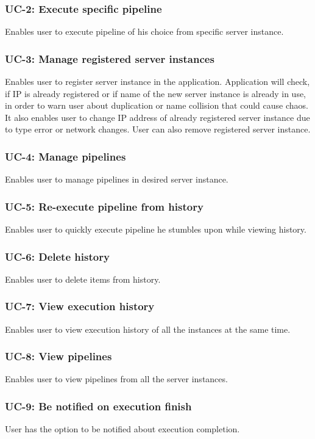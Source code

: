 \subsubsection*{UC-2: Execute specific pipeline}
Enables user to execute pipeline of his choice from specific server instance.
\subsubsection*{UC-3: Manage registered server instances}
Enables user to register server instance in the application. Application will check, if IP is already registered or if name of the new server instance is already in use, in order to warn user about duplication or name collision that could cause chaos. It also enables user to change IP address of already registered server instance due to type error or network changes. User can also remove registered server instance.
\subsubsection*{UC-4: Manage pipelines}
Enables user to manage pipelines in desired server instance.
\subsubsection*{UC-5: Re-execute pipeline from history}
Enables user to quickly execute pipeline he stumbles upon while viewing history.
\subsubsection*{UC-6: Delete history}
Enables user to delete items from history.
\subsubsection*{UC-7: View execution history}
Enables user to view execution history of all the instances at the same time.
\subsubsection*{UC-8: View pipelines}
Enables user to view pipelines from all the server instances.
\subsubsection*{UC-9: Be notified on execution finish}
User has the option to be notified about execution completion.

